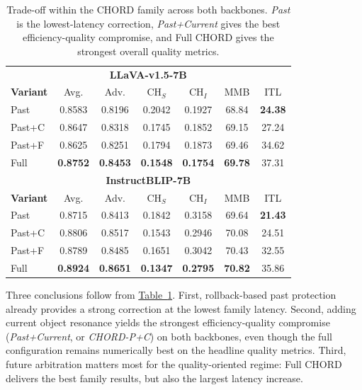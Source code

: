 \documentclass[sigconf,anonymous]{acmart}
\newcommand{\Tref}[1]{\hyperref[#1]{Table~\ref*{#1}}}
\begin{document}
\begin{table}[t]
\centering
\scriptsize
\setlength{\tabcolsep}{3.0pt}
\caption{Trade-off within the CHORD family across both backbones. \textit{Past} is the lowest-latency correction, \textit{Past+Current} gives the best efficiency-quality compromise, and Full CHORD gives the strongest overall quality metrics.}
\label{tab:family_tradeoff}
\begin{tabular}{lcccccc}
\toprule
\multicolumn{7}{c}{\textbf{LLaVA-v1.5-7B}} \\
\textbf{Variant} & Avg. & Adv. & CH$_S$ & CH$_I$ & MMB & ITL \\
\midrule
Past      & 0.8583 & 0.8196 & 0.2042 & 0.1927 & 68.84 & \textbf{24.38} \\
Past+C    & 0.8647 & 0.8318 & 0.1745 & 0.1852 & 69.15 & 27.24 \\
Past+F    & 0.8625 & 0.8251 & 0.1794 & 0.1873 & 69.46 & 34.62 \\
Full      & \textbf{0.8752} & \textbf{0.8453} & \textbf{0.1548} & \textbf{0.1754} & \textbf{69.78} & 37.31 \\
\midrule
\multicolumn{7}{c}{\textbf{InstructBLIP-7B}} \\
\textbf{Variant} & Avg. & Adv. & CH$_S$ & CH$_I$ & MMB & ITL \\
\midrule
Past      & 0.8715 & 0.8413 & 0.1842 & 0.3158 & 69.64 & \textbf{21.43} \\
Past+C    & 0.8806 & 0.8517 & 0.1543 & 0.2946 & 70.08 & 24.51 \\
Past+F    & 0.8789 & 0.8485 & 0.1651 & 0.3042 & 70.43 & 32.55 \\
Full      & \textbf{0.8924} & \textbf{0.8651} & \textbf{0.1347} & \textbf{0.2795} & \textbf{70.82} & 35.86 \\
\bottomrule
\end{tabular}
\end{table}

Three conclusions follow from \Tref{tab:family_tradeoff}. First, rollback-based past protection already provides a strong correction at the lowest family latency. Second, adding current object resonance yields the strongest efficiency-quality compromise (\textit{Past+Current}, or \textit{CHORD-P+C}) on both backbones, even though the full configuration remains numerically best on the headline quality metrics. Third, future arbitration matters most for the quality-oriented regime: Full CHORD delivers the best family results, but also the largest latency increase.
\end{document}
